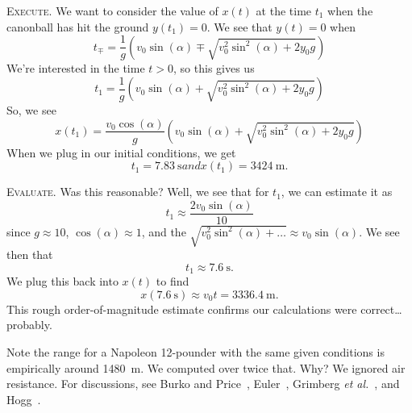\textsc{Execute.}
We want to consider the value of $x(t)$ at the time $t_{1}$ when the
canonball has hit the ground $y(t_{1})=0$. We see that $y(t)=0$ when
\begin{equation}
t_{\mp} = \frac{1}{g}\left(v_{0}\sin(\alpha)
         \mp\sqrt{v_{0}^{2}\sin^{2}(\alpha) + 2y_{0}g}\right)
\end{equation}
We're interested in the time $t>0$, so this gives us
\begin{equation}
t_{1} = \frac{1}{g}\left(v_{0}\sin(\alpha)
         + \sqrt{v_{0}^{2}\sin^{2}(\alpha) + 2y_{0}g}\right)
\end{equation}
So, we see
\begin{equation}
x(t_{1}) = \frac{v_{0}\cos(\alpha)}{g}\left(v_{0}\sin(\alpha)
         + \sqrt{v_{0}^{2}\sin^{2}(\alpha) + 2y_{0}g}\right)
\end{equation}
When we plug in our initial conditions, we get
\begin{subequations}
\begin{equation}
t_{1}=\SI{7.83}{\second}
\end{equation}
and
\begin{equation}
x(t_{1})=\SI{3424}{\meter}.
\end{equation}
\end{subequations}

\textsc{Evaluate.} Was this reasonable? Well, we see that for $t_{1}$,
we can estimate it as
\begin{equation}
t_{1}\approx \frac{2v_{0}\sin(\alpha)}{10}
\end{equation}
since $g\approx 10$, $\cos(\alpha)\approx 1$, and the
$\sqrt{v_{0}^{2}\sin^{2}(\alpha)+\dots}\approx 
v_{0}\sin(\alpha)$. We see then that
\begin{equation}
t_{1}\approx \SI{7.6}{\second}.
\end{equation}
We plug this back into $x(t)$ to find
\begin{equation}
x(\SI{7.6}{\second})\approx v_{0}t = \SI{3336.4}{\meter}.
\end{equation}
This rough order-of-magnitude estimate confirms our calculations were
correct\dots probably.

\begin{rmk}
Note the range for a Napoleon 12-pounder with the same given conditions
is empirically around \SI{1480}{\meter}. We computed over twice
that. Why? We ignored air resistance. For discussions, see
Burko and Price~\cite{burko2003}, Euler~\cite{e77,e217,e226,e853}, 
Grimberg \emph{et al.}~\cite{grimberg2008}, and Hogg~\cite{hogg2007}. 
\end{rmk}

